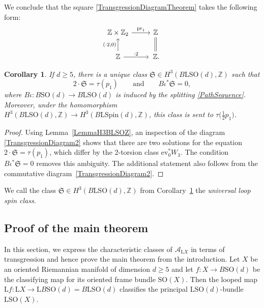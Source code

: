\documentclass[pdftex]{sigma}
\numberwithin{equation}{section}
\newtheorem{Corollary}[Theorem]{Corollary}
\newcommand{\Z}{\mathbb{Z}}
\newcommand{\A}{\mathcal{A}}
\newcommand{\SO}{\mathrm{SO}}
\newcommand{\Spin}{\mathrm{Spin}}
\renewcommand{\L}{\mathrm{L}}
\begin{document}
We conclude that the square \eqref{TransgressionDiagramTheorem} takes the following form:
\begin{equation}\label{TransgressionDiagram2}
\begin{tikzcd}
 \Z \times \Z_2 \ar[r, "\mathrm{pr}_1"] & \Z \ar[d, equal] \\
 \Z \ar[u, "(\cdot 2\text{,} 0)"] \ar[r, "\cdot 2"] &\, \Z.
\end{tikzcd}
\end{equation}


\begin{Corollary} \label{CorollaryStringClass}
If $d \geq 5$, there is a unique class $\mathfrak{S} \in H^3(B\L\SO(d), \Z)$ such that
\begin{equation*}
2 \cdot \mathfrak{S} = \tau(p_1) \qquad \text{and} \qquad B\iota^*\mathfrak{S} = 0,
\end{equation*}
where $B\iota\colon B\SO(d) \to B\L\SO(d)$ is induced by the splitting \eqref{PathSequence}.
Moreover, under the homomorphism $H^3(B\L\SO(d), \Z) \to H^3(B\L\Spin(d), \Z)$, this class is sent to $\tau\big(\frac{1}{2}p_1\big)$.
\end{Corollary}

\begin{proof}
Using Lemma~\ref{LemmaH3BLSOZ}, an inspection of the diagram \eqref{TransgressionDiagram2} shows that there are two solutions for the equation $2 \cdot \mathfrak{S} = \tau(p_1)$, which differ by the 2-torsion class $\mathrm{ev}_0^*W_3$.
The condition $B\iota^*\mathfrak{S} = 0$ removes this ambiguity.
The additional statement also follows from the commutative diagram~\eqref{TransgressionDiagram2}.
\end{proof}

\begin{Definition} \label{DefinitionStringClass}
We call the class $\mathfrak{S} \in H^3(B\L\SO(d), \Z)$ from Corollary~\ref{CorollaryStringClass} the \emph{universal loop spin class}.
\end{Definition}

\subsection{Proof of the main theorem}

In this section, we express the characteristic classes of $\A_{\L X}$ in terms of transgression and hence prove the main theorem from the introduction.
Let $X$ be an oriented Riemannian manifold of dimension $d\geq5$ and let $f\colon X \to B\SO(d)$ be the classifying map for its oriented frame bundle $\SO(X)$.
Then the looped map $\L f\colon \L X \to \L B\SO(d) = B\L\SO(d)$ classifies the principal $\L\SO(d)$-bundle $\L\SO(X)$.
\end{document}
